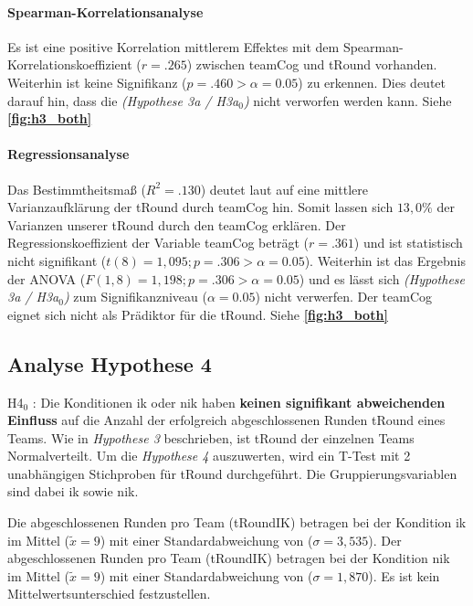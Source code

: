 \documentclass[a4paper,11pt]{article}%
\renewcommand{\\}{\vspace*{0.5\baselineskip} \newline}
\begin{document}
			\paragraph{Spearman-Korrelationsanalyse}
Es ist eine positive Korrelation mittlerem Effektes mit dem Spearman-Korrelationskoeffizient ($r = .265$) zwischen \ac{teamCog} und \ac{tRound} vorhanden. Weiterhin ist keine Signifikanz ($p = .460 > \alpha = 0.05$) zu erkennen. Dies deutet darauf hin, dass die \textit{(Hypothese 3a / H3a$_{0}$)} nicht verworfen werden kann. Siehe \textbf{\autoref{fig:h3_both}}
			
			\paragraph{Regressionsanalyse}
Das Bestimmtheitsmaß ($R^{2} = .130$) deutet laut \citep{cohen2013statistical} auf eine mittlere Varianzaufklärung der \ac{tRound} durch \ac{teamCog} hin. Somit lassen sich $13,0\%$ der Varianzen unserer \ac{tRound} durch den \ac{teamCog} erklären. \\
Der Regressionskoeffizient der Variable \ac{teamCog} beträgt ($r = .361$) und ist statistisch nicht signifikant ($t(8) = 1,095; p = .306 > \alpha = 0.05$). \\
Weiterhin ist das Ergebnis der ANOVA ($F(1,8) = 1,198; p = .306 > \alpha = 0.05$) und es lässt sich \textit{(Hypothese 3a / H3a$_{0}$)} zum Signifikanzniveau ($\alpha = 0.05$) nicht verwerfen. \\
Der \ac{teamCog} eignet sich nicht als Prädiktor für die \ac{tRound}.
Siehe \textbf{\autoref{fig:h3_both}}

\newpage
	\subsection{Analyse Hypothese 4}
H4$_{0}$ : Die Konditionen \ac{ik} oder \ac{nik} haben \textbf{keinen signifikant abweichenden Einfluss} auf die Anzahl der erfolgreich abgeschlossenen Runden \ac{tRound} eines Teams.\\
Wie in \textit{Hypothese 3} beschrieben, ist \ac{tRound} der einzelnen Teams Normalverteilt.
Um die  \textit{Hypothese 4} auszuwerten, wird ein T-Test mit 2 unabhängigen Stichproben für \ac{tRound} durchgeführt. Die Gruppierungsvariablen sind dabei \ac{ik} sowie \ac{nik}.

Die abgeschlossenen Runden pro Team (\ac{tRoundIK}) betragen bei der Kondition \ac{ik} im Mittel ($\tilde x = 9$) mit einer Standardabweichung von ($\sigma = 3,535$).\newline 
Der abgeschlossenen Runden pro Team (\ac{tRoundIK}) betragen bei der Kondition \ac{nik} im Mittel ($\tilde x = 9$) mit einer Standardabweichung von ($\sigma = 1,870$). \newline 
Es ist kein Mittelwertsunterschied festzustellen.
\end{document}
